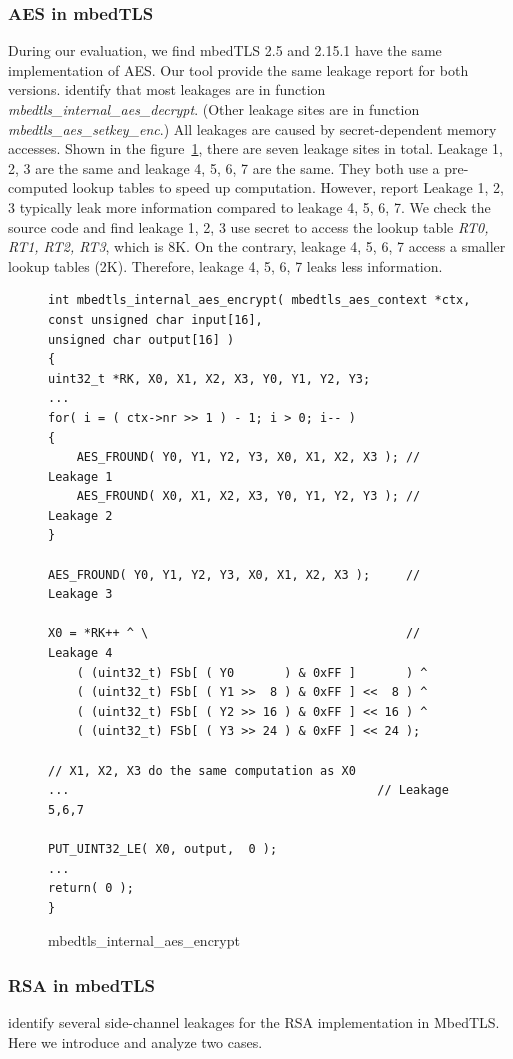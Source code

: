 \subsubsection{AES in mbedTLS} 
During our evaluation, we find mbedTLS 2.5 and 2.15.1 have
the same implementation of AES. Our tool provide the same leakage report
for both versions. \tool{} identify that most leakages are in 
function \emph{mbedtls\_internal\_aes\_decrypt}. (Other leakage sites are
in function \emph{mbedtls\_aes\_setkey\_enc}.) All leakages
are caused by secret-dependent memory accesses. 
Shown in the figure~\ref{mbedtls_aes}, there are seven leakage sites in 
total. Leakage 1, 2, 3 are the same and leakage 4, 5, 6, 7 are the 
same. They both use a pre-computed lookup tables to speed up computation.
However, \tool{} report Leakage 1, 2, 3 typically leak more information compared
to leakage 4, 5, 6, 7. We check the source code and find leakage 1, 2, 3 
use secret to access the lookup table \emph{RT0, RT1, RT2, RT3}, which
is 8K. On the contrary, leakage 4, 5, 6, 7 access a smaller lookup tables (2K).
Therefore, leakage 4, 5, 6, 7 leaks less information.
\begin{figure}[h!]
    \centering
\begin{lstlisting}[xleftmargin=.02\textwidth,xrightmargin=.01\textwidth]
int mbedtls_internal_aes_encrypt( mbedtls_aes_context *ctx,
const unsigned char input[16],
unsigned char output[16] )
{
uint32_t *RK, X0, X1, X2, X3, Y0, Y1, Y2, Y3;
...
for( i = ( ctx->nr >> 1 ) - 1; i > 0; i-- )
{
    AES_FROUND( Y0, Y1, Y2, Y3, X0, X1, X2, X3 ); // Leakage 1
    AES_FROUND( X0, X1, X2, X3, Y0, Y1, Y2, Y3 ); // Leakage 2
}

AES_FROUND( Y0, Y1, Y2, Y3, X0, X1, X2, X3 );     // Leakage 3

X0 = *RK++ ^ \                                    // Leakage 4
    ( (uint32_t) FSb[ ( Y0       ) & 0xFF ]       ) ^
    ( (uint32_t) FSb[ ( Y1 >>  8 ) & 0xFF ] <<  8 ) ^
    ( (uint32_t) FSb[ ( Y2 >> 16 ) & 0xFF ] << 16 ) ^
    ( (uint32_t) FSb[ ( Y3 >> 24 ) & 0xFF ] << 24 );

// X1, X2, X3 do the same computation as X0
...                                           // Leakage 5,6,7

PUT_UINT32_LE( X0, output,  0 );
...
return( 0 );
}
\end{lstlisting}
\caption{mbedtls\_internal\_aes\_encrypt}
\label{mbedtls_aes}
\end{figure}

\subsubsection{RSA in mbedTLS}
\tool{} identify several side-channel leakages for the RSA implementation
in MbedTLS. Here we introduce and analyze two cases. 

